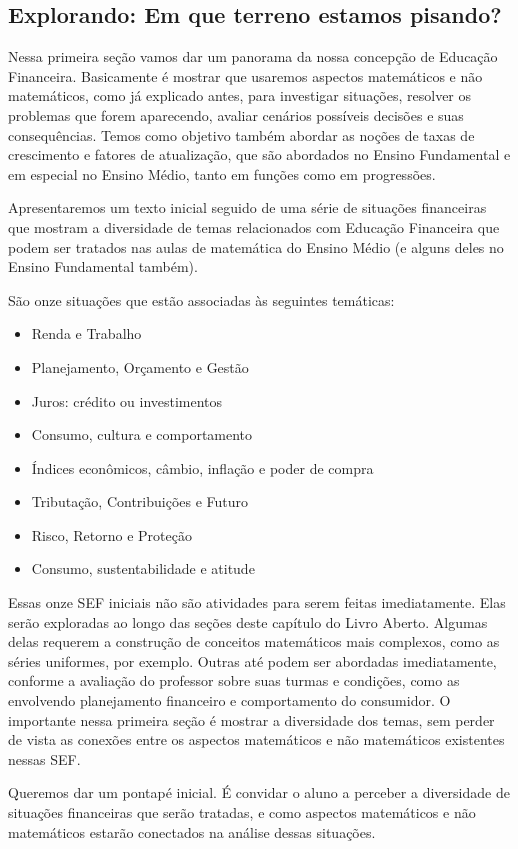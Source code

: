 \def\currentcolor{session1}
\begin{texto}
{
  \section{Explorando: Em que terreno estamos pisando?}
  Nessa primeira seção vamos dar um panorama da nossa concepção de Educação Financeira. Basicamente é mostrar que usaremos aspectos matemáticos e não matemáticos, como já explicado antes, para investigar situações, resolver os problemas que forem aparecendo, avaliar cenários possíveis decisões e suas consequências. Temos como objetivo também abordar as noções de taxas de crescimento e fatores de atualização, que são abordados no Ensino Fundamental e em especial no Ensino Médio, tanto em funções como em progressões. 

  Apresentaremos um texto inicial seguido de uma série de situações financeiras que mostram a diversidade de temas relacionados com Educação Financeira que podem ser tratados nas aulas de matemática do Ensino Médio (e alguns deles no Ensino Fundamental também).

  São onze situações que estão associadas às seguintes temáticas:
  \begin{itemize}
  \item Renda e Trabalho
  \item Planejamento, Orçamento e Gestão
  \item Juros: crédito ou investimentos
  \item Consumo, cultura e comportamento
  \item Índices econômicos, câmbio, inflação e poder de compra
  \item Tributação, Contribuições e Futuro
  \item Risco, Retorno e Proteção
  \item Consumo, sustentabilidade e atitude
  \end{itemize}

  Essas onze SEF iniciais não são atividades para serem feitas imediatamente. Elas serão exploradas ao longo das seções deste capítulo do Livro Aberto. Algumas delas requerem a construção de conceitos matemáticos mais complexos, como as séries uniformes, por exemplo. Outras até podem ser abordadas imediatamente, conforme a avaliação do professor sobre suas turmas e condições, como as envolvendo planejamento financeiro e comportamento do consumidor. O importante nessa primeira seção é mostrar a diversidade dos temas, sem perder de vista as conexões entre os aspectos matemáticos e não matemáticos existentes nessas SEF.

  Queremos dar um pontapé inicial. É convidar o aluno a perceber a diversidade de situações financeiras que serão tratadas, e como aspectos matemáticos e não matemáticos estarão conectados na análise dessas situações.

}
\end{texto}

